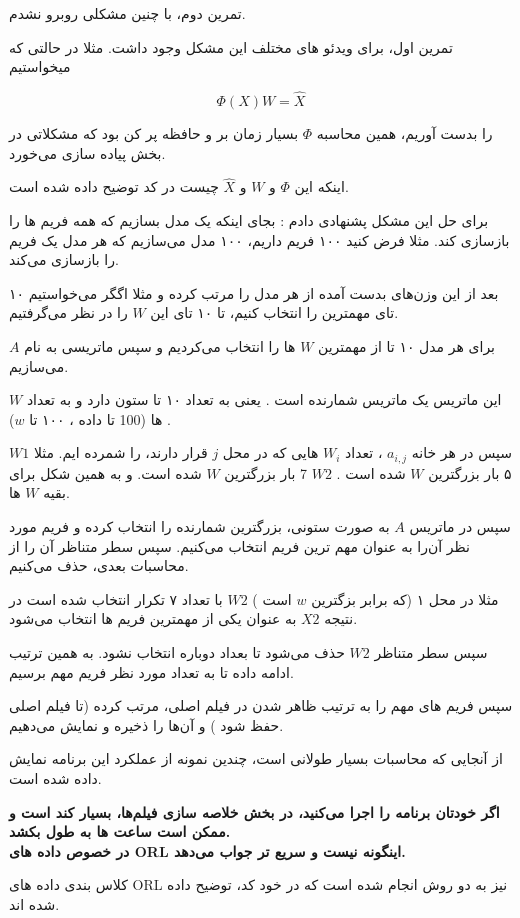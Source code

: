 \documentclass[a4paper, 12pt]{article}
\begin{document}
تمرین دوم، با چنین مشکلی روبرو نشدم.

تمرین اول، برای ویدئو های مختلف این مشکل وجود داشت. مثلا 
در حالتی که میخواستیم 

$$
\Phi(X)W = \hat{X}
$$
 
 را بدست آوریم، همین محاسبه 
 $\Phi$
 بسیار زمان بر و حافظه پر کن بود که مشکلاتی در بخش پیاده سازی می‌خورد. 
 
 اینکه این 
 $\Phi$
 و
 $W$
 و
 $\hat{X}$
 چیست در کد توضیح داده شده است.
 
 برای حل این مشکل پشنهادی دادم : بجای اینکه یک مدل بسازیم که همه فریم ها را بازسازی کند. مثلا فرض کنید ۱۰۰ فریم داریم، ۱۰۰ مدل می‌سازیم که هر مدل یک فریم را بازسازی می‌کند. 
 
 بعد از این وزن‌های بدست آمده از هر مدل را مرتب کرده و مثلا اگگر می‌خواستیم ۱۰ تای مهمترین را انتخاب کنیم، تا ۱۰ تای این 
 $W$
 را در نظر می‌گرفتیم.  
 
 برای هر مدل ۱۰ تا از مهمترین 
 $W$
 ها را انتخاب می‌کردیم و سپس ماتریسی به نام
 $A$
 می‌سازیم.
 
 این ماتریس یک ماتریس شمارنده است . یعنی به تعداد ۱۰ تا ستون دارد و به تعداد 
 $W$
 ها (100 تا داده ، ۱۰۰ تا $w$)
 .

سپس در هر خانه 
$a_{i,j}$
، تعداد 
$W_i$
هایی که در محل 
$j$
قرار دارند، را شمرده ایم. 
مثلا 
$W1$
۵ بار بزرگترین 
$W$
شده است
.
$W2$
7 
بار بزرگترین 
$W$
شده است. 
و به همین شکل برای بقیه 
$W$
ها.

سپس در ماتریس 
$A$
به صورت ستونی، بزرگترین 
شمارنده را انتخاب کرده و فریم مورد نظر آن‌را به عنوان مهم ترین فریم انتخاب می‌کنیم. سپس سطر متناظر آن را از 
محاسبات بعدی، حذف می‌کنیم. 

مثلا 
در محل ۱ (که برابر بزگترین 
$w$
است
)
$W2$
با تعداد ۷ تکرار انتخاب شده است در نتیجه 
$X2$
به عنوان یکی از مهمترین فریم ها انتخاب می‌شود. 

سپس سطر متناظر 
$W2$
حذف می‌شود تا بعداد دوباره انتخاب نشود. 
به همین ترتیب ادامه داده تا به تعداد مورد نظر فریم مهم برسیم. 


سپس فریم های مهم را به ترتیب ظاهر شدن در فیلم اصلی، مرتب کرده (تا 
فیلم اصلی حفظ شود
)
و آن‌ها را ذخیره و نمایش می‌دهیم.



از آنجایی که محاسبات بسیار طولانی است، چندین نمونه از عملکرد این برنامه نمایش داده شده است.

\textbf{
اگر خودتان برنامه را اجرا می‌کنید، در بخش خلاصه سازی فیلم‌ها، بسیار کند است و ممکن است ساعت ها به طول بکشد. 
\\
در خصوص داده های 
ORL
اینگونه نیست و سریع تر جواب می‌دهد.
}

کلاس بندی داده های 
ORL
نیز به دو روش انجام شده است که در خود کد، توضیح داده شده اند.
\end{document}
